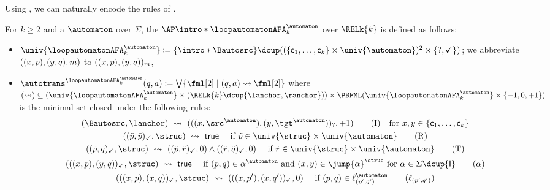 \documentclass[10pt,a4paper]{article}
\theoremstyle{definition}
\theoremstyle{remark}
\DeclarePairedDelimiter\set{\{}{\}}
\DeclarePairedDelimiter\tuple{(}{)}
\newcommand{\const}[1]{\mathsf{#1}}
\newcommand{\defeq}{\coloneq}
\newcommand{\id}{\const{I}}
\newcommand{\vsig}{\Sigma}
\begin{document}
Using , we can naturally encode the rules of .
\begin{defi}\label{definition: loop-automaton to 2AFA}
    For $k \ge 2$ and a  $\automaton$ over $\vsig$,
    the  $\AP\intro*\loopautomatonAFA_{k}^{\automaton}$ over $\RELk{k}$ is defined as follows:
    \begin{itemize}
        \item \AP $\univ{\loopautomatonAFA_{k}^{\automaton}} \defeq \set{\intro*\Bautosrc} \dcup ((\set{\const{c}_1, \dots, \const{c}_k} \times \univ{\automaton})^2 \times \set{?, \checkmark})$; we abbreviate $\tuple{\tuple{x, p}, \tuple{y, q}, m}$ to $\tuple{\tuple{x, p}, \tuple{y, q}}_{m}$,
        \item $\autotrans^{\loopautomatonAFA_{k}^{\automaton}}(q, a) \defeq \bigvee \set{\fml[2] \mid \tuple{q, a} \leadsto \fml[2]}$ where
        $(\leadsto) \subseteq (\univ{\loopautomatonAFA_{k}^{\automaton}} \times (\RELk{k} \dcup \set{\lanchor,\ranchor}))
        \times \PBFML(\univ{\loopautomatonAFA_{k}^{\automaton}} \times \set{-1, 0, +1})$ is the minimal set closed under the following rules:
        \begin{gather*}
        \tuple{\Bautosrc, \lanchor} ~\leadsto~ \tuple{\tuple{\tuple{x, \src^{\automaton}}, \tuple{y, \tgt^{\automaton}}}_{?}, +1} \tag{I} \quad \text{for $x,y \in \set{\const{c}_1, \dots, \const{c}_k}$}\\
            \tuple{\tuple{\tilde{p}, \tilde{p}}_{\checkmark}, \struc} ~\leadsto~ \const{true} \quad\text{ if $\tilde{p} \in \univ{\struc} \times \univ{\automaton}$} \tag{R}\\
            \tuple{\tuple{\tilde{p}, \tilde{q}}_{\checkmark}, \struc} ~\leadsto~ \tuple{\tuple{\tilde{p}, \tilde{r}}_{\checkmark}, 0} \land \tuple{\tuple{\tilde{r}, \tilde{q}}_{\checkmark}, 0} \quad\text{ if $\tilde{r} \in \univ{\struc} \times \univ{\automaton}$} \tag{T}\\
            \tuple{\tuple{\tuple{x, p}, \tuple{y, q}}_{\checkmark}, \struc} ~\leadsto~ \const{true} \quad\text{ if $\tuple{p, q} \in \alpha^{\automaton} \mbox{ and } \tuple{x, y} \in \jump{\alpha}^{\struc}$ for $\alpha \in \vsig \dcup \set{\id}$} \tag{$\alpha$}\\
            \tuple{\tuple{\tuple{x, p}, \tuple{x, q}}_{\checkmark}, \struc} ~\leadsto~ \tuple{\tuple{\tuple{x, p'}, \tuple{x, q'}}_{\checkmark},0} \quad\text{ if $\tuple{p, q} \in \ell_{\tuple{p', q'}}^{\automaton}$} \tag{$\ell_{\tuple{p', q'}}$}\\

\end{gather*}
\end{itemize}
\end{defi}
\end{document}
